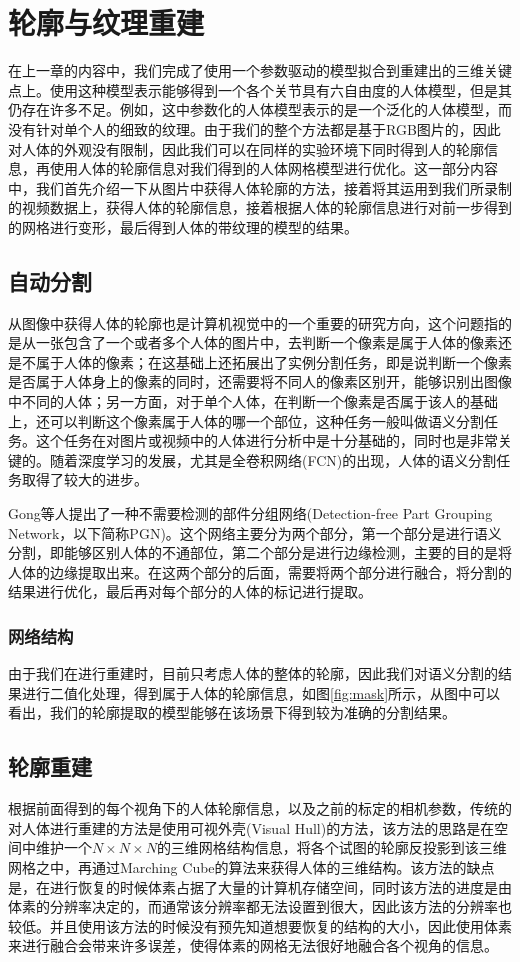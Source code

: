 \section{轮廓与纹理重建}

在上一章的内容中，我们完成了使用一个参数驱动的模型拟合到重建出的三维关键点上。使用这种模型表示能够得到一个各个关节具有六自由度的人体模型，但是其仍存在许多不足。例如，这中参数化的人体模型表示的是一个泛化的人体模型，而没有针对单个人的细致的纹理。由于我们的整个方法都是基于RGB图片的，因此对人体的外观没有限制，因此我们可以在同样的实验环境下同时得到人的轮廓信息，再使用人体的轮廓信息对我们得到的人体网格模型进行优化。这一部分内容中，我们首先介绍一下从图片中获得人体轮廓的方法，接着将其运用到我们所录制的视频数据上，获得人体的轮廓信息，接着根据人体的轮廓信息进行对前一步得到的网格进行变形，最后得到人体的带纹理的模型的结果。

\subsection{自动分割}
从图像中获得人体的轮廓也是计算机视觉中的一个重要的研究方向，这个问题指的是从一张包含了一个或者多个人体的图片中，去判断一个像素是属于人体的像素还是不属于人体的像素；在这基础上还拓展出了实例分割任务，即是说判断一个像素是否属于人体身上的像素的同时，还需要将不同人的像素区别开，能够识别出图像中不同的人体；另一方面，对于单个人体，在判断一个像素是否属于该人的基础上，还可以判断这个像素属于人体的哪一个部位，这种任务一般叫做语义分割任务。这个任务在对图片或视频中的人体进行分析中是十分基础的，同时也是非常关键的。随着深度学习的发展，尤其是全卷积网络(FCN)的出现，人体的语义分割任务取得了较大的进步。

Gong等人\cite{cihppgn}提出了一种不需要检测的部件分组网络(Detection-free Part Grouping Network，以下简称PGN)。这个网络主要分为两个部分，第一个部分是进行语义分割，即能够区别人体的不通部位，第二个部分是进行边缘检测，主要的目的是将人体的边缘提取出来。在这两个部分的后面，需要将两个部分进行融合，将分割的结果进行优化，最后再对每个部分的人体的标记进行提取。

\subsubsection{网络结构}

由于我们在进行重建时，目前只考虑人体的整体的轮廓，因此我们对语义分割的结果进行二值化处理，得到属于人体的轮廓信息，如图\ref{fig:mask}所示，从图中可以看出，我们的轮廓提取的模型能够在该场景下得到较为准确的分割结果。

\subsection{轮廓重建}
根据前面得到的每个视角下的人体轮廓信息，以及之前的标定的相机参数，传统的对人体进行重建的方法是使用可视外壳(Visual Hull)的方法，该方法的思路是在空间中维护一个\(N\times N\times N\)的三维网格结构信息，将各个试图的轮廓反投影到该三维网格之中，再通过Marching Cube的算法来获得人体的三维结构。该方法的缺点是，在进行恢复的时候体素占据了大量的计算机存储空间，同时该方法的进度是由体素的分辨率决定的，而通常该分辨率都无法设置到很大，因此该方法的分辨率也较低。并且使用该方法的时候没有预先知道想要恢复的结构的大小，因此使用体素来进行融合会带来许多误差，使得体素的网格无法很好地融合各个视角的信息。

